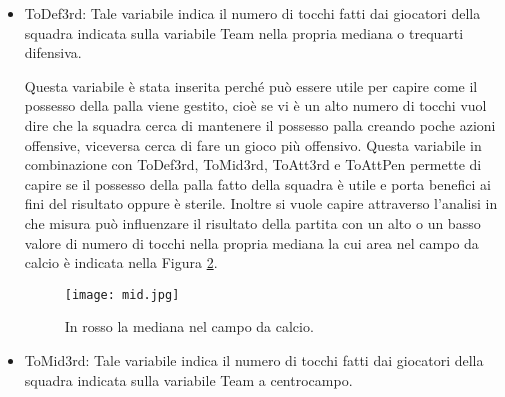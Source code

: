 \begin{itemize}
	Questa variabile è stata inserita perché può essere utile per capire come il possesso della palla viene gestito, cioè se vi è un alto numero di tocchi vuol dire che la squadra subisce molto la pressione della squadra avversaria, viceversa cerca di fare un gioco più offensivo. Questa variabile in combinazione con \textsf{ToDef3rd}, \textsf{ToMid3rd}, \textsf{ToAtt3rd} e \textsf{ToAttPen} permette di capire se il possesso della palla fatto della squadra è utile e porta benefici ai fini del risultato oppure è sterile. Inoltre si vuole capire attraverso l'analisi in che misura può influenzare il risultato della partita con un alto o un basso valore di numero di tocchi nella propria area di rigore la cui area nel campo da calcio è indicata nella Figura \ref{fig:penalty}.
	
	\begin{figure}[!h]
		\begin{center}
			\texttt{[image: rigore.jpg]}
			\caption{In rosso l'area di rigore in un campo da calcio.} 
			\label{fig:penalty}
		\end{center}
	\end{figure}
	

	\item \textsf{ToDef3rd}: Tale variabile indica il numero di tocchi fatti dai giocatori della squadra indicata sulla variabile \textsf{Team} nella propria mediana o trequarti difensiva. 
	
	Questa variabile è stata inserita perché può essere utile per capire come il possesso della palla viene gestito, cioè se vi è un alto numero di tocchi vuol dire che la squadra cerca di mantenere il possesso palla creando poche azioni offensive, viceversa cerca di fare un gioco più offensivo. Questa variabile in combinazione con \textsf{ToDef3rd}, \textsf{ToMid3rd}, \textsf{ToAtt3rd} e \textsf{ToAttPen} permette di capire se il possesso della palla fatto della squadra è utile e porta benefici ai fini del risultato oppure è sterile. Inoltre si vuole capire attraverso l'analisi in che misura può influenzare il risultato della partita con un alto o un basso valore di numero di tocchi nella propria mediana la cui area nel campo da calcio è indicata nella Figura \ref{fig:def}.
	
		\begin{figure}[!h]
		\begin{center}
			\texttt{[image: mid.jpg]}
			\caption{In rosso la mediana nel campo da calcio.} 
			\label{fig:def}
		\end{center}
	\end{figure}
	\item \textsf{ToMid3rd}: Tale variabile indica il numero di tocchi fatti dai giocatori della squadra indicata sulla variabile \textsf{Team} a centrocampo. 
	

\end{itemize}
